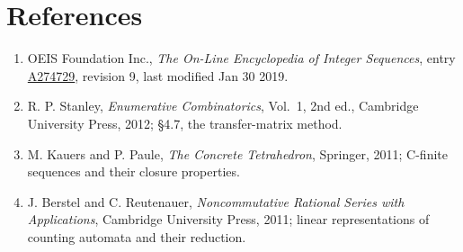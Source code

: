 \documentclass[11pt]{article}
\theoremstyle{definition}
\begin{document}
\section{References}

\begin{enumerate}

\item OEIS Foundation Inc., \emph{The On-Line Encyclopedia of Integer Sequences}, entry \href{https://oeis.org/A274729}{A274729}, revision 9, last modified Jan 30 2019.

\item R. P. Stanley, \emph{Enumerative Combinatorics}, Vol.~1, 2nd ed., Cambridge University Press, 2012; \S4.7, the transfer-matrix method.

\item M. Kauers and P. Paule, \emph{The Concrete Tetrahedron}, Springer, 2011; C-finite sequences and their closure properties.

\item J. Berstel and C. Reutenauer, \emph{Noncommutative Rational Series with Applications}, Cambridge University Press, 2011; linear representations of counting automata and their reduction.

\end{enumerate}
\end{document}
